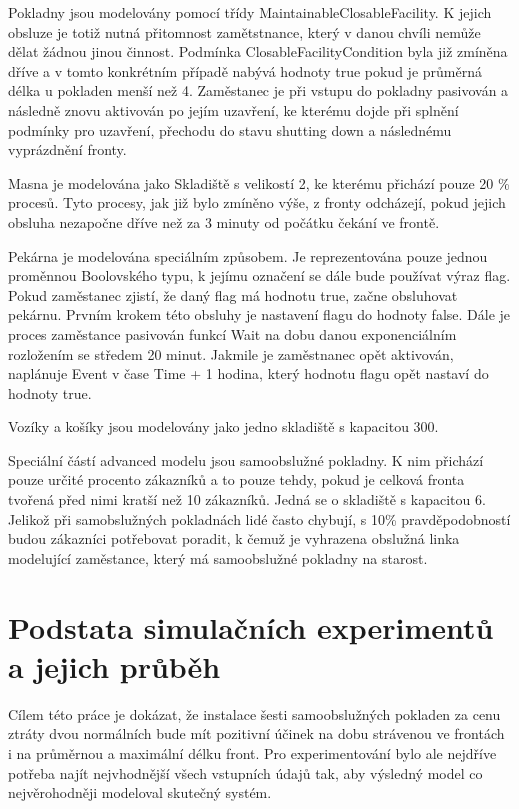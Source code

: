 \documentclass[12pt,a4paper,titlepage]{article}
\begin{document}
Pokladny jsou modelovány pomocí třídy MaintainableClosableFacility. K jejich obsluze je totiž nutná přitomnost zamětstnance, který v danou chvíli nemůže dělat žádnou jinou činnost. Podmínka ClosableFacilityCondition byla již zmíněna dříve a v tomto konkrétním případě nabývá hodnoty true pokud je průměrná délka u pokladen menší než 4. Zaměstanec je při vstupu do pokladny pasivován a následně znovu aktivován po jejím uzavření, ke kterému dojde při splnění podmínky pro uzavření, přechodu do stavu shutting down a následnému vyprázdnění fronty. 

Masna je modelována jako Skladiště s velikostí 2, ke kterému přichází pouze 20 \%  procesů. Tyto procesy, jak již bylo zmíněno výše, z fronty odcházejí, pokud jejich obsluha nezapočne dříve než za 3 minuty od počátku čekání ve frontě. 

Pekárna je modelována speciálním způsobem. Je reprezentována pouze jednou proměnnou Boolovského typu, k jejímu označení se dále bude používat výraz flag. Pokud zaměstanec zjistí, že daný flag má hodnotu true, začne obsluhovat pekárnu.  Prvním krokem této obsluhy je  nastavení flagu do hodnoty false. Dále je proces zaměstance pasivován funkcí Wait na dobu danou exponenciálním rozložením se středem 20 minut. Jakmile je zaměstnanec opět aktivován, naplánuje Event v čase Time + 1 hodina, který hodnotu flagu opět nastaví do hodnoty true. 

Vozíky a košíky jsou modelovány jako jedno skladiště s kapacitou 300. 

Speciální částí advanced modelu jsou samoobslužné pokladny. K nim přichází pouze určité procento zákazníků a to pouze tehdy, pokud je celková fronta tvořená před nimi kratší než 10 zákazníků. Jedná se o skladiště s kapacitou 6. Jelikož při samobslužných pokladnách lidé často chybují, s 10\%  pravděpodobností budou zákazníci potřebovat poradit, k čemuž je vyhrazena obslužná linka modelující zaměstance, který má samoobslužné pokladny na starost.  


\section{Podstata simulačních experimentů a jejich průběh}
Cílem této práce je dokázat, že instalace šesti samoobslužných pokladen za cenu ztráty dvou normálních bude mít pozitivní účinek na dobu strávenou ve frontách i na průměrnou a maximální délku front. Pro experimentování bylo ale nejdříve potřeba najít nejvhodnější všech vstupních údajů tak, aby výsledný model co nejvěrohodněji modeloval skutečný systém. 
\end{document}
